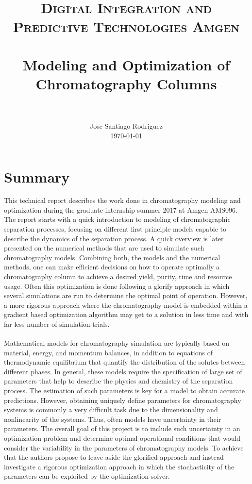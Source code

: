 \documentclass[paper=a4, fontsize=11pt]{scrartcl}
\title{
		\usefont{OT1}{bch}{b}{n}
		\normalfont \normalsize \textsc{Digital Integration and Predictive Technologies Amgen} \\ [25pt]
		\horrule{0.5pt} \\[0.4cm]
		\huge Modeling and Optimization of Chromatography Columns \\
		\horrule{2pt} \\[0.5cm]
}
\author{
		\normalfont 								\normalsize
        Jose Santiago Rodriguez\\[-3pt]		\normalsize
        \today
}
\date{}
\begin{document}
\maketitle
\section{Summary}
This technical report describes the work done in chromatography modeling and optimization during the graduate internship summer 2017 at Amgen AMS096. The report starts with a quick introduction to modeling of chromatographic separation processes, focusing on different first principle models capable to describe the dynamics of the separation process. A quick overview is later presented on the numerical methods that are used to simulate such chromatography models. Combining both, the models and the numerical methods, one can make efficient decisions on how to operate optimally a chromatography column to achieve a desired yield, purity, time and resource usage. Often this optimization is done following a glorify approach in which several simulations are run to determine the optimal point of operation. However, a more rigorous approach where the chromatography model is embedded within a gradient based optimization algorithm may get to a solution in less time and with far less number of simulation trials. 
\\
\\
Mathematical models for chromatography simulation are typically based on material, energy, and momentum balances, in addition to equations of thermodynamic equilibrium that quantify the distribution of the solutes between different phases. In general, these models require the specification of large set of parameters that help to describe the physics and chemistry of the separation process. The estimation of such parameters is key for a model to obtain accurate predictions. However, obtaining uniquely define parameters for chromatography systems is commonly a very difficult task due to the dimensionality and nonlinearity of the systems. Thus, often models have uncertainty in their parameters. The overall goal of this project is to include such uncertainty in an optimization problem and determine optimal operational conditions that would consider the variability in the parameters of chromatography models. To achieve that the authors propose to leave aside the glorified approach and instead investigate a rigorous optimization approach in which the stochasticity of the parameters can be exploited by the optimization solver. 
\\
\end{document}
